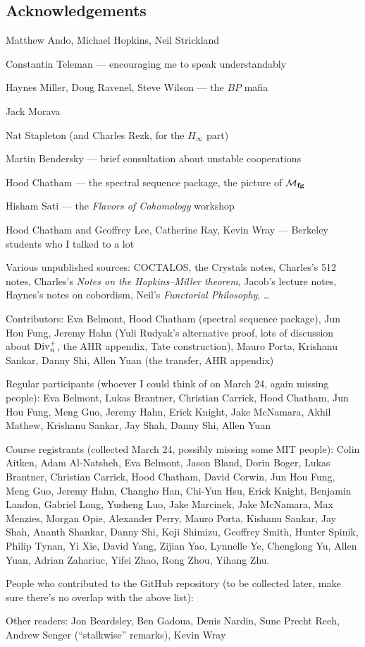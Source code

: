 


\newpage

\subsection*{Acknowledgements}

Matthew Ando, Michael Hopkins, Neil Strickland

Constantin Teleman --- encouraging me to speak understandably

Haynes Miller, Doug Ravenel, Steve Wilson --- the $BP$ mafia

Jack Morava

Nat Stapleton (and Charles Rezk, for the $H_\infty$ part)

Martin Bendersky --- brief consultation about unstable cooperations

Hood Chatham --- the spectral sequence package, the picture of $\mathcal{M}_{\mathbf{fg}}$

Hisham Sati --- the \textit{Flavors of Cohomology} workshop

Hood Chatham and Geoffrey Lee, Catherine Ray, Kevin Wray --- Berkeley students who I talked to a lot

Various unpublished sources: COCTALOS, the Crystals notes, Charles's 512 notes, Charles's \textit{Notes on the Hopkins--Miller theorem}, Jacob's lecture notes, Haynes's notes on cobordism, Neil's \textit{Functorial Philosophy}, \ldots





Contributors: Eva Belmont, Hood Chatham (spectral sequence package), Jun Hou Fung, Jeremy Hahn (Yuli Rudyak's alternative proof, lots of discussion about $\operatorname{Div}_n^+$, the AHR appendix, Tate construction), Mauro Porta, Krishanu Sankar, Danny Shi, Allen Yuan (the transfer, AHR appendix)

Regular participants (whoever I could think of on March 24, again missing people): Eva Belmont, Lukas Brantner, Christian Carrick, Hood Chatham, Jun Hou Fung, Meng Guo, Jeremy Hahn, Erick Knight, Jake McNamara, Akhil Mathew, Krishanu Sankar, Jay Shah, Danny Shi, Allen Yuan

Course registrants (collected March 24, possibly missing some MIT people): Colin Aitken, Adam Al-Natsheh, Eva Belmont, Jason Bland, Dorin Boger, Lukas Brantner, Christian Carrick, Hood Chatham, David Corwin, Jun Hou Fung, Meng Guo, Jeremy Hahn, Changho Han, Chi-Yun Hsu, Erick Knight, Benjamin Landon, Gabriel Long, Yusheng Luo, Jake Marcinek, Jake McNamara, Max Menzies, Morgan Opie, Alexander Perry, Mauro Porta, Kishanu Sankar, Jay Shah, Ananth Shankar, Danny Shi, Koji Shimizu, Geoffrey Smith, Hunter Spinik, Philip Tynan, Yi Xie, David Yang, Zijian Yao, Lynnelle Ye, Chenglong Yu, Allen Yuan, Adrian Zahariuc, Yifei Zhao, Rong Zhou, Yihang Zhu.

People who contributed to the GitHub repository (to be collected later, make sure there's no overlap with the above list): 

Other readers: Jon Beardsley, Ben Gadoua, Denis Nardin, Sune Precht Reeh, Andrew Senger (``stalkwise'' remarks), Kevin Wray

